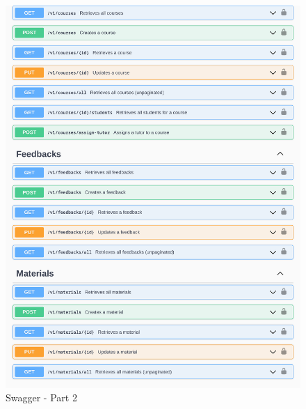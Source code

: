 \begin{justify}
        \begin{figure}[H]
            \begin{minipage}[trim]{1\textwidth}
            \centerline{\includegraphics[width=150mm,scale=1]{figures/implementation_and_testing/implementation/backend/swagger-2.pdf}}
            \caption{Swagger - Part 2}
            \end{minipage}
        \end{figure}



\end{justify}
